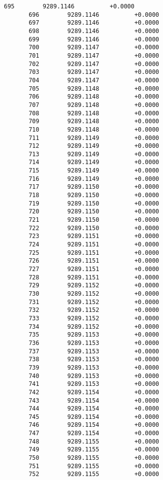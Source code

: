 \documentclass[11pt]{article}
\begin{document}
\begin{Verbatim}[commandchars=\\\{\}]
       695        9289.1146          +0.0000
       696        9289.1146          +0.0000
       697        9289.1146          +0.0000
       698        9289.1146          +0.0000
       699        9289.1146          +0.0000
       700        9289.1147          +0.0000
       701        9289.1147          +0.0000
       702        9289.1147          +0.0000
       703        9289.1147          +0.0000
       704        9289.1147          +0.0000
       705        9289.1148          +0.0000
       706        9289.1148          +0.0000
       707        9289.1148          +0.0000
       708        9289.1148          +0.0000
       709        9289.1148          +0.0000
       710        9289.1148          +0.0000
       711        9289.1149          +0.0000
       712        9289.1149          +0.0000
       713        9289.1149          +0.0000
       714        9289.1149          +0.0000
       715        9289.1149          +0.0000
       716        9289.1149          +0.0000
       717        9289.1150          +0.0000
       718        9289.1150          +0.0000
       719        9289.1150          +0.0000
       720        9289.1150          +0.0000
       721        9289.1150          +0.0000
       722        9289.1150          +0.0000
       723        9289.1151          +0.0000
       724        9289.1151          +0.0000
       725        9289.1151          +0.0000
       726        9289.1151          +0.0000
       727        9289.1151          +0.0000
       728        9289.1151          +0.0000
       729        9289.1152          +0.0000
       730        9289.1152          +0.0000
       731        9289.1152          +0.0000
       732        9289.1152          +0.0000
       733        9289.1152          +0.0000
       734        9289.1152          +0.0000
       735        9289.1153          +0.0000
       736        9289.1153          +0.0000
       737        9289.1153          +0.0000
       738        9289.1153          +0.0000
       739        9289.1153          +0.0000
       740        9289.1153          +0.0000
       741        9289.1153          +0.0000
       742        9289.1154          +0.0000
       743        9289.1154          +0.0000
       744        9289.1154          +0.0000
       745        9289.1154          +0.0000
       746        9289.1154          +0.0000
       747        9289.1154          +0.0000
       748        9289.1155          +0.0000
       749        9289.1155          +0.0000
       750        9289.1155          +0.0000
       751        9289.1155          +0.0000
       752        9289.1155          +0.0000

\end{Verbatim}
\end{document}
